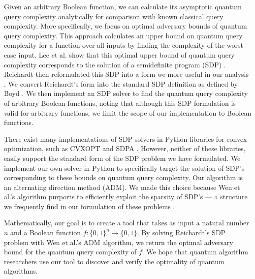 Given an arbitrary Boolean function, we can calculate its
asymptotic quantum query complexity analytically for
comparison with known classical query complexity. More
specifically, we focus on optimal adversary bounds of
quantum query complexity. This approach calculates an upper
bound on quantum query complexity for a function over all
inputs by finding the complexity of the worst-case input.
Lee et al. show that this optimal upper bound of quantum
query complexity corresponds to the solution of a
semidefinite program (SDP)
\cite{lee2011quantum}. Reichardt then reformulated this SDP
into a form we more useful in our analysis
\cite{reichardt2009span}. We convert Reichardt's
form into the standard SDP definition as defined by Boyd
\cite{boyd2004convex}. We then implement an SDP
solver to find the quantum query complexity of arbitrary
Boolean functions, noting that although this SDP
formulation is valid for arbitrary functions, we limit the
scope of our implementation to Boolean functions.

There exist many implementations of SDP solvers in Python
libraries for convex optimization, such as CVXOPT and SDPA
\cite{cvxopt, SDPA}. However, neither of these libraries,
easily support the standard form of
the SDP problem we have formulated. We implement our own
solver in Python to specifically target the solution of
SDP's corresponding to these bounds on quantum query
complexity. Our algorithm is an alternating
direction method (ADM). We made this choice because Wen et
al.'s algorithm purports to efficiently exploit the
sparsity of SDP's --- a structure we frequently find in our
formulation of these problems \cite{adm}.

Mathematically, our goal is to create a tool that takes as
input a natural number $n$ and a Boolean function 
$f: \{0,1\}^n \rightarrow \{0,1\}$. 
By solving Reichardt's SDP problem with
Wen et al.'s ADM algorithm, we return the optimal adversary bound for 
the quantum query complexity of $f$. 
We hope that quantum algorithm researchers use our tool to 
discover and verify the optimality of quantum algorithms.

